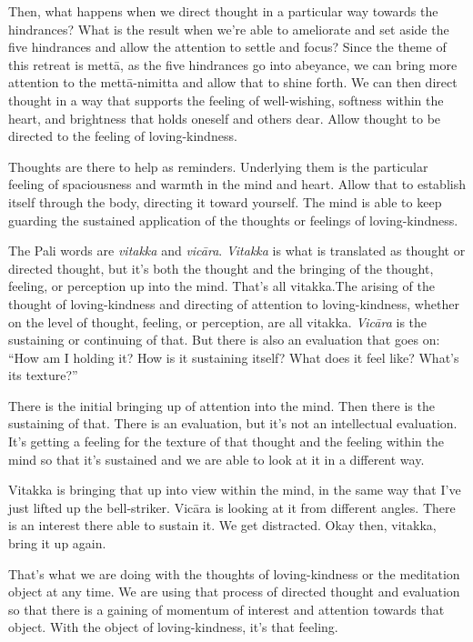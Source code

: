 Then, what happens when we direct thought in a particular way towards
the hindrances? What is the result when we’re able to ameliorate and set
aside the five hindrances and allow the attention to settle and focus?
Since the theme of this retreat is mettā, as the five hindrances go into
abeyance, we can bring more attention to the mettā-nimitta and allow
that to shine forth. We can then direct thought in a way that supports
the feeling of well-wishing, softness within the heart, and brightness
that holds oneself and others dear. Allow thought to be directed to the
feeling of loving-kindness.

Thoughts are there to help as reminders. Underlying them is the
particular feeling of spaciousness and warmth in the mind and heart.
Allow that to establish itself through the body, directing it toward
yourself. The mind is able to keep guarding the sustained application of
the thoughts or feelings of loving-kindness.

The Pali words are \emph{vitakka} and \emph{vicāra}. \emph{Vitakka} is
what is translated as thought or directed thought, but it’s both the
thought and the bringing of the thought, feeling, or perception up into
the mind. That’s all vitakka.The arising of the thought of
loving-kindness and directing of attention to loving-kindness, whether
on the level of thought, feeling, or perception, are all vitakka.
\emph{Vicāra} is the sustaining or continuing of that. But there is also
an evaluation that goes on: “How am I holding it? How is it sustaining
itself? What does it feel like? What’s its texture?”

There is the initial bringing up of attention into the mind. Then there
is the sustaining of that. There is an evaluation, but it’s not an
intellectual evaluation. It’s getting a feeling for the texture of that
thought and the feeling within the mind so that it’s sustained and we
are able to look at it in a different way.

Vitakka is bringing that up into view within the mind, in the same way
that I’ve just lifted up the bell-striker. Vicāra is looking at it from
different angles. There is an interest there able to sustain it. We get
distracted. Okay then, vitakka, bring it up again.

That’s what we are doing with the thoughts of loving-kindness or the
meditation object at any time. We are using that process of directed
thought and evaluation so that there is a gaining of momentum of
interest and attention towards that object. With the object of
loving-kindness, it’s that feeling.

